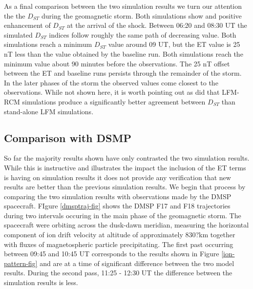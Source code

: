 \documentclass[draft,jgrga]{agutex}
\begin{document}
\begin{article}
As a final comparison between the two simulation results we turn our attention the the $D_{ST}$ during the geomagnetic storm.  Both simulations show and positive enhancement of $D_{ST}$ at the arrival of the shock.  Between 06:20 and 08:30 UT the simulated $D_{ST}$ indices follow roughly the same path of decreasing value.  Both simulations reach a minimum $D_{ST}$ value around 09 UT, but the ET value is 25 nT less  than the value obtained by the baseline run.  Both simulations reach the minimum value about 90 minutes before the observations.  The 25 nT offset between the ET and baseline runs persists through the remainder of the storm.  In the later phases of the storm the observed values come closest to the observations.  While not shown here, it is worth pointing out as  \cite{Li:2016cv} did that LFM-RCM simulations produce a significantly better agreement between $D_{ST}$ than stand-alone LFM simulations. 

 \subsection{Comparison with DSMP}
 \label{sec-dmsp}

So far the majority results shown have only contrasted the two simulation results.  While this is instructive and illustrates the impact the inclusion of the ET terms is having on simulation results it does not provide any verification that new results are better than the previous simulation results.  We begin that process by comparing the two simulation results with observations made by the DMSP spacecraft.  FIgure \ref{dmsptraj-fig} shows the DMSP F17 and F18 trajectories during two intervals occuring in the main phase of the geomagnetic storm.  The spacecraft were orbiting across the dusk-dawn meridian, measuring the horizontal component of ion drift velocity at altitude of approximately 830?km together with fluxes of magnetospheric particle precipitating.  The first past occurring between 09:45 and 10:45 UT corresponds to the results shown in Figure \ref{ion-pattern-fig} and are at a time of significant difference between the two model results.  During the second pass, 11:25 - 12:30 UT the difference between the simulation results is less.


\end{article}
\end{document}
